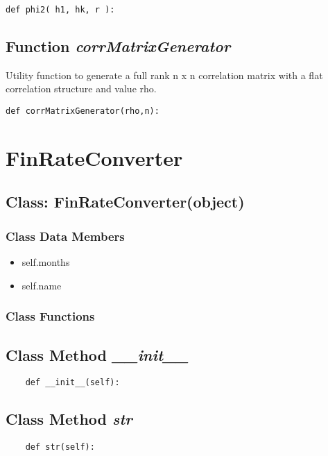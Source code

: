 \documentclass[twoside,11pt]{book}
\begin{document}
\begin{lstlisting}
def phi2( h1, hk, r ):
\end{lstlisting}

\subsection{Function {\it corrMatrixGenerator}}
Utility function to generate a full rank n x n correlation matrix with a flat correlation structure and value rho. 

\begin{lstlisting}
def corrMatrixGenerator(rho,n):
\end{lstlisting}

\newpage
\section{FinRateConverter}

\subsection{Class: FinRateConverter(object)}


\subsubsection{Class Data Members}
\begin{itemize}
\item{self.months}
\item{self.name}
\end{itemize}

\subsubsection{Class Functions}

\subsection{Class Method {\it \_\_init\_\_}}


\begin{lstlisting}
    def __init__(self):
\end{lstlisting}

\subsection{Class Method {\it str}}


\begin{lstlisting}
    def str(self):
\end{lstlisting}
\end{document}
